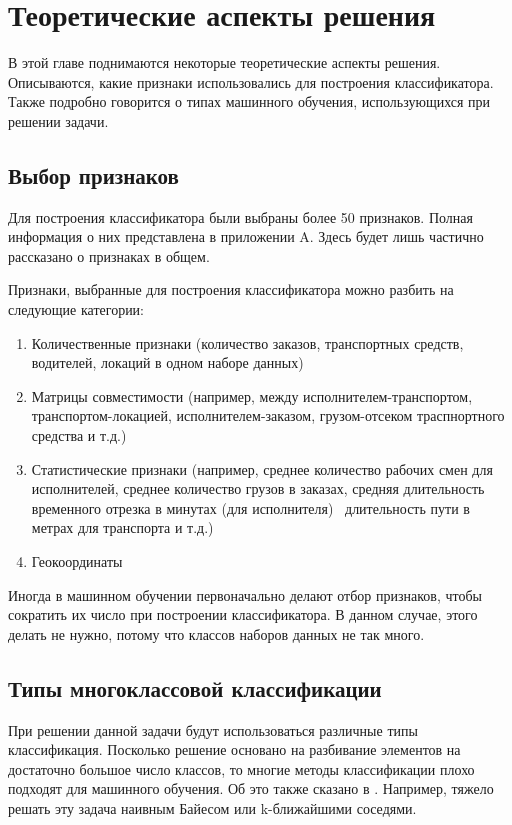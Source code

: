 \chapter{Теоретические аспекты решения }

В этой главе поднимаются некоторые теоретические аспекты решения.
Описываются, какие признаки использовались для построения классификатора.
Также подробно говорится о типах машинного обучения, использующихся при решении задачи.

\section{Выбор признаков}

Для построения классификатора были выбраны более 50 признаков.
Полная информация о них представлена в приложении A.
Здесь будет лишь частично рассказано о признаках в общем.

Признаки, выбранные для построения классификатора можно разбить на следующие категории:

\begin{enumerate}
	\item Количественные признаки (количество заказов, транспортных средств, водителей, локаций в одном наборе данных)
	\item Матрицы совместимости (например, между исполнителем-транспортом, транспортом-локацией, исполнителем-заказом, грузом-отсеком траспнортного средства и т.д.)
	\item Статистические признаки (например, среднее количество рабочих смен для исполнителей, среднее количество грузов в заказах, средняя длительность временного отрезка в минутах (для исполнителя) \ длительность пути в метрах для транспорта и т.д.)
	\item Геокоординаты
\end{enumerate}

Иногда в машинном обучении первоначально делают отбор признаков, чтобы сократить их число при построении классификатора.
В данном случае, этого делать не нужно, потому что классов наборов данных не так много.

\section{Типы многоклассовой классификации}

При решении данной задачи будут использоваться различные типы классификация.
Посколько решение основано на разбивание элементов на достаточно большое число классов, то многие методы классификации плохо подходят для машинного обучения.
Об это также сказано в \cite{many-classes}.
Например, тяжело решать эту задача наивным Байесом или k-ближайшими соседями.

